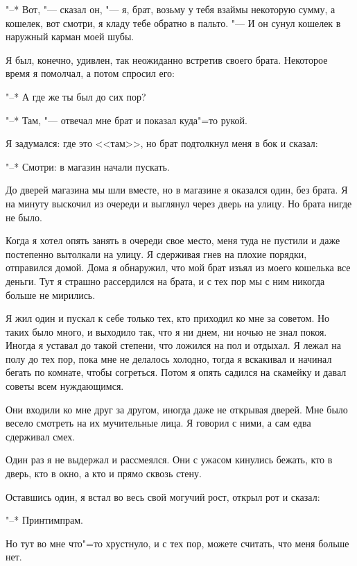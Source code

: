 "--* Вот, "--- сказал он, "--- я, брат, возьму у тебя взаймы некоторую сумму, а кошелек, вот смотри, я кладу тебе обратно в пальто. "--- И он сунул кошелек в наружный карман моей шубы.
 
Я был, конечно, удивлен, так неожиданно
встретив своего брата. Некоторое время я помолчал, а потом спросил его:
 
"--* А где же ты был до сих пор?
 
"--* Там, "--- отвечал мне брат и показал куда"=то рукой.
 
Я задумался: где это <<там>>, но брат подтолкнул меня в бок и сказал:

"--* Смотри: в магазин начали пускать.
 
До дверей магазина мы шли вместе, но в магазине я оказался один, без брата. Я на минуту выскочил из очереди и выглянул через
дверь на улицу. Но брата нигде не было.
 
Когда я хотел опять занять в очереди свое место, меня туда не пустили и даже постепенно вытолкали на улицу. Я сдерживая
гнев на плохие порядки, отправился домой. Дома я обнаружил, что мой брат изъял из моего кошелька все деньги. Тут я страшно рассердился на брата, и с тех пор мы с ним никогда больше не мирились.
 
Я жил один и пускал к себе только тех, кто приходил ко мне за советом. Но таких было много, и выходило так, что я ни днем, ни
ночью не знал покоя. Иногда я уставал до такой степени, что ложился на пол и отдыхал.
Я лежал на полу до тех пор, пока мне не делалось холодно, тогда я вскакивал и начинал
бегать по комнате, чтобы согреться. Потом я опять садился на скамейку и давал советы
всем нуждающимся.

Они входили ко мне друг за другом, иногда даже не открывая дверей. Мне было весело
смотреть на их мучительные лица. Я говорил с ними, а сам едва сдерживал смех.

Один раз я не выдержал и рассмеялся. Они с ужасом кинулись бежать, кто в дверь, кто в
окно, а кто и прямо сквозь стену.

Оставшись один, я встал во весь свой могучий рост, открыл рот и сказал:

"--* Принтимпрам.

Но тут во мне что"=то хрустнуло, и с тех
пор, можете считать, что меня больше нет.